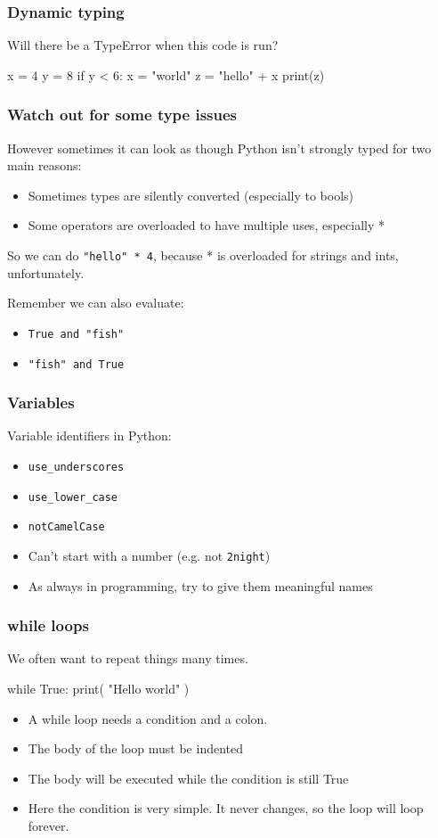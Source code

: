\documentclass{beamer}
\begin{document}
\begin{frame}[fragile]
\frametitle{Dynamic typing}
Will there be a TypeError when this code is run?

\begin{code}
x = 4
y = 8
if y < 6:
   x = "world"
z = "hello" + x
print(z)
\end{code}

\end{frame}



\begin{frame}[fragile]
\frametitle{Watch out for some type issues}
However sometimes it can look as though Python isn't strongly typed
for two main reasons: 
\begin{itemize}
\item Sometimes types are silently converted (especially to bools)
\item Some operators are overloaded to have multiple uses, especially *
\end{itemize}
So we can do \texttt{"hello" * 4}, because * is overloaded for
strings and ints, unfortunately. 

\bigskip

Remember we can also evaluate: 
\begin{itemize}
\item \texttt{True and "fish"} 
\item \texttt{"fish" and True}
\end{itemize}

\end{frame}



\begin{frame}[fragile]
\frametitle{Variables}

Variable identifiers in Python:
\begin{itemize}
\item \texttt{use\_underscores}
\item \texttt{use\_lower\_case}
\item \texttt{notCamelCase}
\item Can't start with a number (e.g. not \texttt{2night})
\item As always in programming, try to give them meaningful names
\end{itemize}
\end{frame}

\begin{frame}[fragile]
\frametitle{while loops}
We often want to repeat things many times.
\begin{code}
while True:
   print( "Hello world" )
\end{code}
\begin{itemize}
\item A while loop needs a condition and a colon.
\item The body of the loop must be indented
\item The body will be executed while the condition is still True
\item Here the condition is very simple. It never changes, so the loop
  will loop forever.
\end{itemize}
\end{frame}
\end{document}

